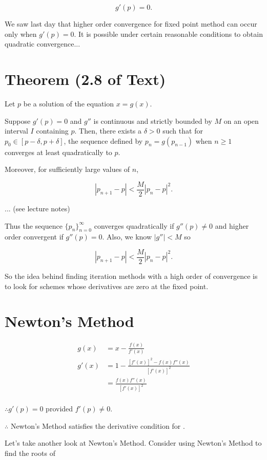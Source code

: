\[
g'(p) = 0
.\]

We saw last day that higher order convergence for fixed point method can 
occur only when $g'(p) = 0$. It is possible under certain reasonable conditions
to obtain quadratic convergence...

\section{Theorem (2.8 of Text)}

Let $p$ be a solution of the equation $x = g(x)$.

Suppose $g'(p) = 0$ and $g''$ is continuous and strictly bounded by $M$ on an
open interval $I$ containing $p$. Then, there exists a $\delta > 0$ such that
for $p_0 \in [p-\delta, p+\delta]$, the sequence defined by $p_n = g(p_{n-1})$
when $n\geq 1$ converges at least quadratically to $p$.

Moreover, for sufficiently large values of $n$, 

\[
|p_{n+1} - p| < \frac{M}{2} |p_n - p|^2
.\]

\proof... (see lecture notes)

Thus the sequence $\{ p_n \}_{n=0}^\infty$ converges quadratically if
$g''(p) \neq 0$ and higher order convergent if $g''(p) = 0$. Also, we know
$|g''| < M $ so 

\[
|p_{n+1} - p| < \frac{M}{2} |p_n - p|^2
.\]

So the idea behind finding iteration methods with a high order of convergence
is to look for schemes whose derivatives are zero at the fixed point.

\section{Newton's Method}

\begin{align*}
  g(x) &= x-\frac{f(x)}{f'(x)} \\
  g'(x) &= 1-\frac{[f'(x)]^2 - f(x) f''(x)}{[f'(x)]^2} \\
        &= \frac{f(x)f''(x)}{[f'(x)]^2} \\
\end{align*}

$\therefore g'(p) = 0$ provided $f'(p) \neq 0$.

$\therefore$ Newton's Method satisfies the derivative condition for .

\pagebreak

Let's take another look at Newton's Method. Consider using Newton's Method to
find the roots of

